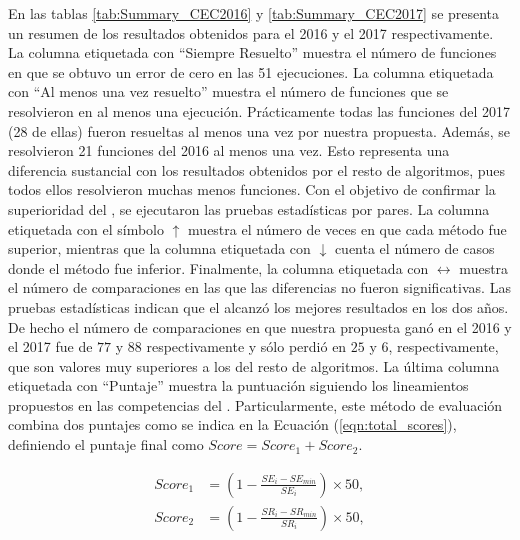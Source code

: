 En las tablas \ref{tab:Summary_CEC2016} y \ref{tab:Summary_CEC2017} se presenta un resumen de los resultados obtenidos para el \CEC{} 2016 y el \CEC{} 2017 respectivamente.
%
La columna etiquetada con ``Siempre Resuelto'' muestra el número de funciones en que se obtuvo un error de cero en las 51 ejecuciones.
%
La columna etiquetada con ``Al menos una vez resuelto'' muestra el número de funciones que se resolvieron en al menos una ejecución.
%
Prácticamente todas las funciones del \CEC{} 2017 (28 de ellas) fueron resueltas al menos una vez por nuestra propuesta.
%
Además, se resolvieron 21 funciones del \CEC{} 2016 al menos una vez.
%
Esto representa una diferencia sustancial con los resultados obtenidos por el resto de algoritmos, pues todos ellos resolvieron muchas menos funciones.
%
Con el objetivo de confirmar la superioridad del \DEEDM{}, se ejecutaron las pruebas estadísticas por pares.
%
La columna etiquetada con el símbolo $\uparrow$ muestra el número de veces en que cada método fue superior, mientras que la columna etiquetada 
con $\downarrow$ cuenta el número de casos donde el método fue inferior.
%
Finalmente, la columna etiquetada con $\longleftrightarrow$ muestra el número de comparaciones en las que las diferencias no fueron significativas.
%
Las pruebas estadísticas indican que el \DEEDM{} alcanzó los mejores resultados en los dos años.
%
De hecho el número de comparaciones en que nuestra propuesta ganó en el \CEC{} 2016 y el \CEC{} 2017 fue de $77$ y $88$ respectivamente y
sólo perdió en $25$ y $6$, respectivamente, que son valores muy superiores a los del resto de algoritmos.
%
La última columna etiquetada con ``Puntaje'' muestra la puntuación siguiendo los lineamientos propuestos en las competencias del \CEC{}.
%
Particularmente, este método de evaluación combina dos puntajes como se indica en la Ecuación (\ref{eqn:total_scores}),
definiendo el puntaje final como $Score = Score_1 + Score_2$.

%
\begin{equation}\label{eqn:total_scores}
\begin{split}
Score_1 &= \left (1 - \frac{SE_i - SE_{min}}{SE_i} \right) \times 50, \\
Score_2 &= \left  (1 - \frac{SR_i - SR_{min}}{SR_i} \right ) \times 50, \\
\end{split}
\end{equation}

